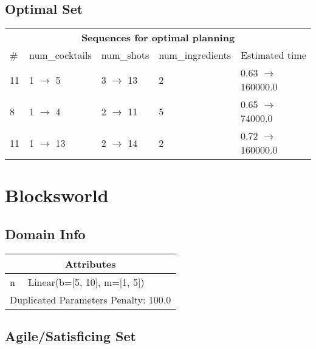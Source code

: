 \documentclass{article}
\begin{document}
                            \subsection*{Optimal Set}

                            \begin{center}
                            \begin{tabular}{l|l|l|l|l}
                            \multicolumn{5}{c}{\bf \large Sequences for optimal planning}\\
                            \# & num\_cocktails & num\_shots & num\_ingredients & Estimated time\\\midrule
                            11&1 $\rightarrow$ 5&3 $\rightarrow$ 13&2&0.63 $\rightarrow$ 160000.0\\
8&1 $\rightarrow$ 4&2 $\rightarrow$ 11&5&0.65 $\rightarrow$ 74000.0\\
11&1 $\rightarrow$ 13&2 $\rightarrow$ 14&2&0.72 $\rightarrow$ 160000.0
                            \end{tabular}
                            \end{center}
                    \newpage \section{Blocksworld}
                    \subsection*{Domain Info}

                    \begin{center}
                    \begin{tabular}{p{}p{}}
                    \multicolumn{2}{c}{\bf \large Attributes}\\\midrule
                    n & Linear(b=[5, 10], m=[1, 5])
                    
                     \\\midrule
                    \multicolumn{2}{l}{Duplicated Parameters Penalty: 100.0}
                    \end{tabular}
                    \end{center}
                
                         \subsection*{Agile/Satisficing Set}
\end{document}
